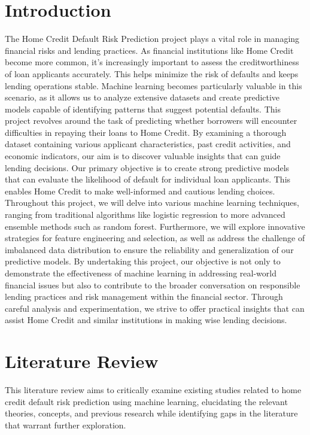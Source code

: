 \documentclass{josis}
\begin{document}
\section{Introduction}
The Home Credit Default Risk Prediction project plays a vital role in managing financial risks and lending practices. As financial institutions like Home Credit become more common, it's increasingly important to assess the creditworthiness of loan applicants accurately. This helps minimize the risk of defaults and keeps lending operations stable. Machine learning becomes particularly valuable in this scenario, as it allows us to analyze extensive datasets and create predictive models capable of identifying patterns that suggest potential defaults. This project revolves around the task of predicting whether borrowers will encounter difficulties in repaying their loans to Home Credit. By examining a thorough dataset containing various applicant characteristics, past credit activities, and economic indicators, our aim is to discover valuable insights that can guide lending decisions. Our primary objective is to create strong predictive models that can evaluate the likelihood of default for individual loan applicants. This enables Home Credit to make well-informed and cautious lending choices. Throughout this project, we will delve into various machine learning techniques, ranging from traditional algorithms like logistic regression to more advanced ensemble methods such as random forest. Furthermore, we will explore innovative strategies for feature engineering and selection, as well as address the challenge of imbalanced data distribution to ensure the reliability and generalization of our predictive models. By undertaking this project, our objective is not only to demonstrate the effectiveness of machine learning in addressing real-world financial issues but also to contribute to the broader conversation on responsible lending practices and risk management within the financial sector. Through careful analysis and experimentation, we strive to offer practical insights that can assist Home Credit and similar institutions in making wise lending decisions. 

\section{Literature Review}
 This literature review aims to critically examine existing studies related to home credit default risk prediction using machine learning, elucidating the relevant theories, concepts, and previous research while identifying gaps in the literature that warrant further exploration.
\end{document}
